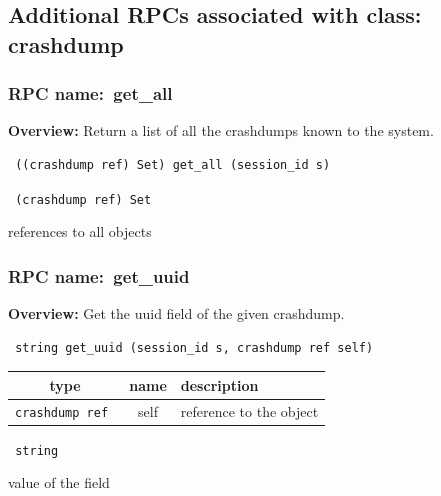 \subsection{Additional RPCs associated with class: crashdump}
\subsubsection{RPC name:~get\_all}

{\bf Overview:} 
Return a list of all the crashdumps known to the system.

\begin{verbatim} ((crashdump ref) Set) get_all (session_id s)\end{verbatim}


\vspace{0.3cm}

{\tt 
(crashdump ref) Set
}


references to all objects
\vspace{0.3cm}
\vspace{0.3cm}
\vspace{0.3cm}
\subsubsection{RPC name:~get\_uuid}

{\bf Overview:} 
Get the uuid field of the given crashdump.

\begin{verbatim} string get_uuid (session_id s, crashdump ref self)\end{verbatim}



 
\vspace{0.3cm}
\begin{tabular}{|c|c|p{7cm}|}
 \hline
{\bf type} & {\bf name} & {\bf description} \\ \hline
{\tt crashdump ref } & self & reference to the object \\ \hline 

\end{tabular}

\vspace{0.3cm}

{\tt 
string
}


value of the field
\vspace{0.3cm}
\vspace{0.3cm}
\vspace{0.3cm}
